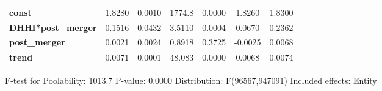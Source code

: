 \documentclass{report}
\begin{document}
\begin{center}
\begin{tabular}{lcccccc}
\midrule
\textbf{const}             &       1.8280       &       0.0010       &      1774.8     &      0.0000      &       1.8260      &       1.8300       \\
\textbf{DHHI*post\_merger} &       0.1516       &       0.0432       &      3.5110     &      0.0004      &       0.0670      &       0.2362       \\
\textbf{post\_merger}      &       0.0021       &       0.0024       &      0.8918     &      0.3725      &      -0.0025      &       0.0068       \\
\textbf{trend}             &       0.0071       &       0.0001       &      48.083     &      0.0000      &       0.0068      &       0.0074       \\
\bottomrule
\end{tabular}
\end{center}

F-test for Poolability: 1013.7 \newline
 P-value: 0.0000 \newline
 Distribution: F(96567,947091) \newline
  \newline
 Included effects: Entity
\end{document}
